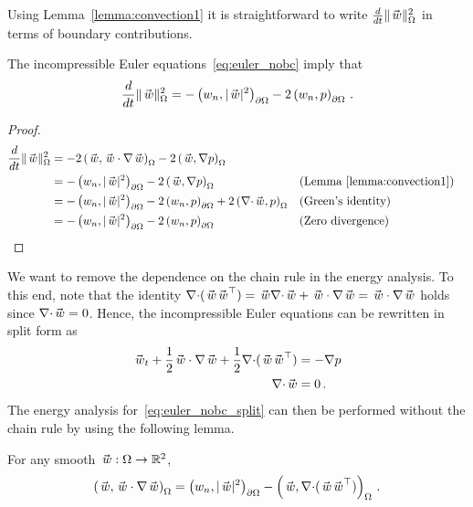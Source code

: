Using Lemma~\ref{lemma:convection1} it is straightforward to write $ \frac{d}{dt} \normc{\wc}^2$ in terms of boundary contributions.
\begin{proposition}\label{prop:energy1}
  The incompressible Euler equations~\eqref{eq:euler_nobc} imply that
  \begin{equation*}
    \frac{d}{dt} \normc{\wc}^2 = -\ipbc{\wcn}{|\wc|^2} - 2\ipbc{\wcn}{p}\,.
  \end{equation*}
\end{proposition}
\begin{proof}
  \begin{align*}
    \frac{d}{dt} \normc{\wc}^2
      &= -2\ipc{\wc}{\wc \cdot \nabla \wc} - 2\ipc{\wc}{\nabla p} \\
      &= -\ipbc{\wcn}{|\wc|^2} - 2\ipc{\wc}{\nabla p} &&\text{(Lemma~\ref{lemma:convection1})} \\
      &= -\ipbc{\wcn}{|\wc|^2} - 2\ipbc{\wcn}{p} + 2\ipc{\div \wc}{p} &&\text{(Green's identity)} \\
      &= -\ipbc{\wcn}{|\wc|^2} - 2\ipbc{\wcn}{p} &&\text{(Zero divergence)} \\
  \end{align*}
\end{proof}

We want to remove the dependence on the chain rule in the energy analysis. To this end, note that the identity
$
  \div (\wc \wc^\top) = \wc \div \wc + \wc \cdot \nabla \wc = \wc \cdot \nabla \wc
$
holds since $\div \wc = 0$. Hence, the incompressible Euler equations  can be rewritten in split form as
\begin{subequations}%
\label{eq:euler_nobc_split}
  \begin{align}
    \wc_t + \frac{1}{2} \wc \cdot \nabla \wc + \frac{1}{2} \div (\wc \wc^\top) &= -\nabla p \label{eq:continuous_euler2} \\
    \div \wc &= 0 \,. \label{eq:div_zero2}
  \end{align}
\end{subequations}
The energy analysis for~\eqref{eq:euler_nobc_split} can then be performed without the chain rule by using the following lemma.

\begin{lemma}\label{lemma:convection2}
  For any smooth $\wc : \Omega \to \mathbb{R}^2$,
  \begin{equation*}
    \ipc{\wc}{\wc \cdot \nabla \wc} = \ipbc{\wcn}{|\wc|^2} - \ipc{\wc}{\div (\wc \wc^\top)} \,.
  \end{equation*}
\end{lemma}

